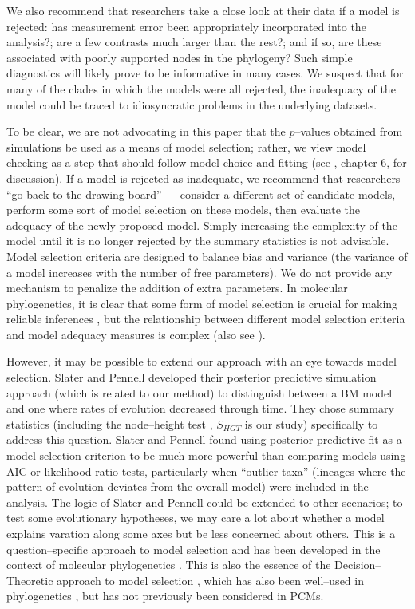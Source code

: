 \documentclass[a4paper,12pt]{article}
\begin{document}
We also recommend that researchers take a close look at their data if a model is rejected: has measurement error been appropriately incorporated into the analysis?; are a few contrasts much larger than the rest?; and if so, are these associated with poorly supported nodes in the phylogeny? Such simple diagnostics will likely prove to be informative in many cases. We suspect that for many of the clades in which the models were all rejected, the inadequacy of the model could be traced to idiosyncratic problems in the underlying datasets.

To be clear, we are not advocating in this paper that the $p$--values obtained from simulations be used as a means of model selection; rather, we view model checking as a step that should follow model choice and fitting (see \citep{Gelmanbook}, chapter 6, for discussion). If a model is rejected as inadequate, we recommend that researchers ``go back to the drawing board'' --- consider a different set of candidate models, perform some sort of model selection on these models, then evaluate the adequacy of the newly proposed model. Simply increasing the complexity of the model until it is no longer rejected by the summary statistics is not advisable.  Model selection criteria are designed to balance bias and variance (the variance of a model increases with the number of free parameters). We do not provide any mechanism to penalize the addition of extra parameters. In molecular phylogenetics, it is clear that some form of model selection is crucial for making reliable inferences \citep{SullivanJoyce2005, Ripplinger2008}, but the relationship between different model selection criteria and model adequacy measures is complex \citep{Ripplinger2010} (also see \citep{Boettiger2012}). 

However, it may be possible to extend our approach with an eye towards model selection. Slater and Pennell \citep{SlaterPennell} developed their posterior predictive simulation approach (which is related to our method) to distinguish between a BM model and one where rates of evolution decreased through time. They chose summary statistics (including the node--height test \citep{FreckletonHarvey2006}, $S_{HGT}$ is our study) specifically to address this question. Slater and Pennell found using posterior predictive fit as a model selection criterion to be much more powerful than comparing models using AIC or likelihood ratio tests, particularly when ``outlier taxa'' (lineages where the pattern of evolution deviates from the overall model) were included in the analysis. The logic of Slater and Pennell could be extended to other scenarios; to test some evolutionary hypotheses, we may care a lot about whether a model explains varation along some axes but be less concerned about others. This is a question--specific approach to model selection and has been developed in the context of molecular phylogenetics \citep{Bollback2002, Lewis2013}. This is also the essence of the Decision--Theoretic approach to model selection \citep{Robert2007}, which has also been well--used in phylogenetics \citep{Minin2003}, but has not previously been considered in PCMs.
\end{document}

